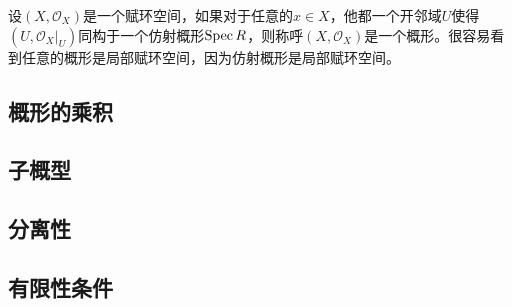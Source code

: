 \para 设$(X,\mathcal{O}_X)$是一个赋环空间，如果对于任意的$x\in X$，他都一个开邻域$U$使得$(U,\mathcal{O}_X|_U)$同构于一个仿射概形$\operatorname{Spec}{R}$，则称呼$(X,\mathcal{O}_X)$是一个概形。很容易看到任意的概形是局部赋环空间，因为仿射概形是局部赋环空间。

\subsection{概形的乘积}

\subsection{子概型}

\subsection{分离性}

\subsection{有限性条件}
